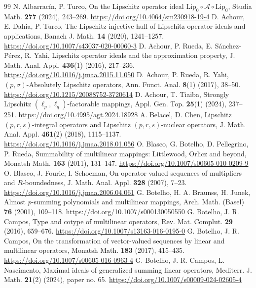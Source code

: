 \documentclass[12pt]{amsart}
\def\A{\mathcal{A}}
\def\Lip{\mathrm{Lip}_0}
\begin{document}
\begin{thebibliography}{99}
	 N. Albarracín, P. Turco, On the Lipschitz operator ideal $\Lip \circ \A \circ \Lip$, Studia Math. \textbf{277} (2024), 243--269. \url{https://doi.org/10.4064/sm230918-19-4}
	 D. Achour, E. Dahia, P. Turco, The Lipschitz injective hull of Lipschitz operator ideals and applications, Banach J. Math. \textbf{14} (2020), 1241--1257. \url{https://doi.org/10.1007/s43037-020-00060-3}
	 D. Achour, P. Rueda, E. Sánchez-Pérez, R. Yahi, Lipschitz operator ideals and the approximation property, J. Math. Anal. Appl. \textbf{436}(1) (2016), 217--236. \url{https://doi.org/10.1016/j.jmaa.2015.11.050}
	 D. Achour, P. Rueda, R. Yahi, $(p,\sigma)$-Absolutely Lipschitz operators, Ann. Funct. Anal. \textbf{8}(1) (2017), 38--50. \url{https://doi.org/10.1215/20088752-3720614}
	 D. Achour, T. Tiaiba, Strongly Lipschitz $(\ell_p,\ell_q)$-factorable mappings, Appl. Gen. Top. \textbf{25}(1) (2024), 237--251. \url{https://doi.org/10.4995/agt.2024.18928}
	 A. Belacel, D. Chen, Lipschitz $(p,r,s)$-integral operators and Lipschitz $(p,r,s)$-nuclear operators, J. Math. Anal. Appl. \textbf{461}(2) (2018), 1115--1137. \url{https://doi.org/10.1016/j.jmaa.2018.01.056}
	 O. Blasco, G. Botelho, D. Pellegrino, P. Rueda, Summability of multilinear mappings: Littlewood, Orlicz and beyond, Monatsh Math. \textbf{163} (2011), 131--147. \url{https://doi.org/10.1007/s00605-010-0209-9}
	 O. Blasco, J. Fourie, I. Schoeman, On operator valued sequences of multipliers and $R$-boundedness, J. Math. Anal. Appl. \textbf{328} (2007), 7--23.  \url{https://doi.org/10.1016/j.jmaa.2006.04.061}
	 G. Botelho, H. A. Braunss, H. Junek, Almost $p$-summing polynomials and multilinear mappings, Arch. Math. (Basel) \textbf{76} (2001), 109--118.  \url{https://doi.org/10.1007/s000130050550}
	 G. Botelho, J. R. Campos, Type and cotype of multilinear operators, Rev. Mat. Complut. \textbf{29} (2016), 659--676. \url{https://doi.org/10.1007/s13163-016-0195-0}
	 G. Botelho, J. R. Campos, On the transformation of vector-valued sequences by linear and multilinear operators, Monatsh Math. \textbf{183} (2017), 415--435. \url{https://doi.org/10.1007/s00605-016-0963-4}
	 G. Botelho, J. R. Campos, L. Nascimento, Maximal ideals of generalized summing linear operators, Mediterr. J. Math. \textbf{21}(2) (2024), paper no. 65.  \url{https://doi.org/10.1007/s00009-024-02605-4}

\end{thebibliography}
\end{document}
